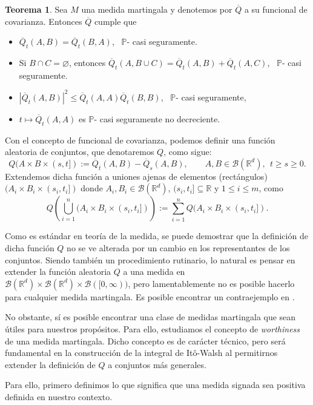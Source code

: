 \documentclass[letterpaper,twoside,12pt]{book}
\newcommand{\R}{\mathbb{R}}
\newcommand{\B}{\mathcal{B}}
\renewcommand{\P}{\mathbb{P}}
\newcommand{\1}{\mathds{1}}
\newcommand{\abs}[1]{\left\lvert #1 \right\rvert}
\theoremstyle{definition}
\theoremstyle{definition}
\newtheorem{teo}{Teorema}
\theoremstyle{remark}
\theoremstyle{definition}
\theoremstyle{definition}
\theoremstyle{definition}
\theoremstyle{definition}
\theoremstyle{definition}
\begin{document}
 \begin{teo} 
  Sea $M$ una medida martingala y denotemos por $\overline{Q}$ a su funcional de covarianza. Entonces $\overline{Q}$ cumple que
  \begin{itemize}
   \item $\overline{Q}_t(A,B)=\overline{Q}_t(B,A)$, \ $\P$- casi seguramente.
   \item Si $B\cap C=\varnothing$, entonces $\overline{Q}_t(A,B\cup C)=\overline{Q}_t(A,B)+\overline{Q}_t(A,C)$, \ $\P$- casi seguramente.
   \item $\abs{\overline{Q}_t(A,B)}^2\leq \overline{Q}_t(A,A)\overline{Q}_t(B,B)$, \ $\P$- casi seguramente, 
   \item $t\mapsto\overline{Q}_t(A,A)$ es $\P$- casi seguramente no decreciente.
  \end{itemize}
  \end{teo}

Con el concepto de funcional de covarianza, podemos definir una función aleatoria de conjuntos, que denotaremos $Q$, como sigue:
\[
   Q(A\times B\times(s,t]):=\overline{Q}_t(A,B)-\overline{Q}_s(A,B), \qquad A,B\in \B(\R^{d}), \ \ t\geq s\geq 0.
   \]
Extendemos dicha función a uniones ajenas de elementos (rectángulos)
$(A_i\times B_i\times(s_i,t_i])$ donde $A_i,B_i\in \B(\R^{d})$, $(s_i,t_i]\subseteq \R$  y $1\leq i \leq m$, como 
\[
Q \left(\bigcup_{i=1}^{n}(A_i\times B_i\times(s_i,t_i])\right):=\sum_{i=1}^{n}Q(A_i\times B_i\times (s_i,t_i]).
\]
  
Como es estándar en teoría de la medida, se puede demostrar que la definición de dicha función $Q$ no se ve alterada por un cambio en los representantes de los conjuntos. Siendo también un procedimiento rutinario, lo natural es pensar en extender la función aleatoria $Q$ a una medida en $\B(\R^{d})\times \B(\R^{d})\times \B([0,\infty))$, pero lamentablemente no es posible hacerlo para cualquier medida martingala. Es posible encontrar un contraejemplo en \cite[pp. 305 - 307]{Walsh_J.B_Introduction_to_SPDEs}. 

No obstante, sí es posible encontrar una clase de medidas martingala que sean útiles para nuestros propósitos. Para ello, estudiamos el concepto de \textit{worthiness} de una medida martingala. Dicho concepto es de carácter técnico, pero será fundamental en la construcción de la integral de Itô-Walsh al permitirnos extender la definición de $Q$ a conjuntos más generales.

Para ello, primero definimos lo que significa que una medida signada sea positiva definida en nuestro contexto.
\end{document}
